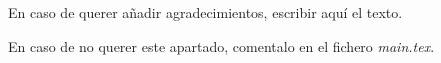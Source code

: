 \thispagestyle{empty}

En caso de querer añadir agradecimientos, escribir aquí el texto.

En caso de no querer este apartado, comentalo en el fichero \textit{main.tex}.

